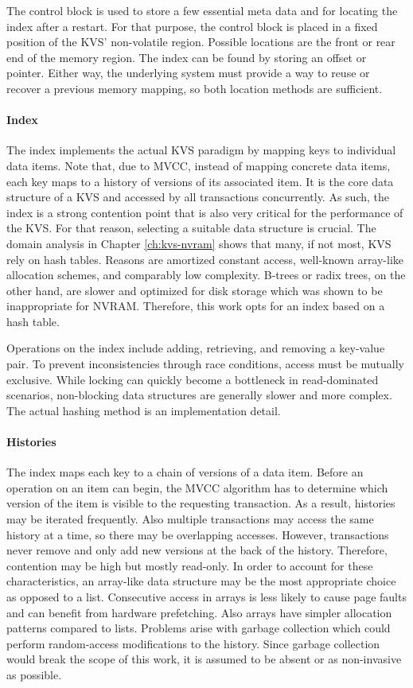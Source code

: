 The control block is used to store a few essential meta data and for locating
the index after a restart. For that purpose, the control block is placed in a
fixed position of the KVS' non-volatile region. Possible locations are the front
or rear end of the memory region. The index can be found by storing an offset or
pointer. Either way, the underlying system must provide a way to reuse or
recover a previous memory mapping, so both location methods are sufficient.

\paragraph{Index}

The index implements the actual KVS paradigm by mapping keys to individual data
items. Note that, due to MVCC, instead of mapping concrete data items, each key
maps to a history of versions of its associated item. It is the core data
structure of a KVS and accessed by all transactions concurrently. As such, the
index is a strong contention point that is also very critical for the
performance of the KVS. For that reason, selecting a suitable data structure is
crucial. The domain analysis in Chapter \ref{ch:kvs-nvram} shows that many, if
not most, KVS rely on hash tables. Reasons are amortized constant access,
well-known array-like allocation schemes, and comparably low complexity. B-trees
or radix trees, on the other hand, are slower and optimized for disk storage
which was shown to be inappropriate for NVRAM. Therefore, this work opts for an
index based on a hash table.

Operations on the index include adding, retrieving, and removing a key-value
pair. To prevent inconsistencies through race conditions, access must be
mutually exclusive. While locking can quickly become a bottleneck in
read-dominated scenarios, non-blocking data structures are generally slower and
more complex. The actual hashing method is an implementation detail.

\paragraph{Histories}

The index maps each key to a chain of versions of a data item. Before an
operation on an item can begin, the MVCC algorithm has to determine which
version of the item is visible to the requesting transaction. As a result,
histories may be iterated frequently. Also multiple transactions may access the
same history at a time, so there may be overlapping accesses. However,
transactions never remove and only add new versions at the back of the history.
Therefore, contention may be high but mostly read-only. In order to account for
these characteristics, an array-like data structure may be the most appropriate
choice as opposed to a list. Consecutive access in arrays is less likely to
cause page faults and can benefit from hardware prefetching. Also arrays have
simpler allocation patterns compared to lists. Problems arise with garbage
collection which could perform random-access modifications to the history. Since
garbage collection would break the scope of this work, it is assumed to be
absent or as non-invasive as possible.

